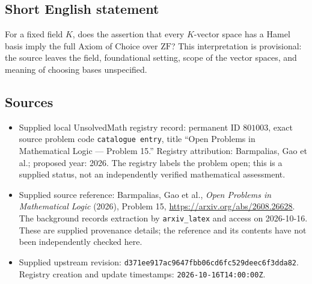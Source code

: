 \documentclass[11pt]{article}
\begin{document}
\subsection{Short English statement}
For a fixed field \(K\), does the assertion that every \(K\)-vector space has a Hamel basis imply the full Axiom of Choice over \(\mathrm{ZF}\)? This interpretation is provisional: the source leaves the field, foundational setting, scope of the vector spaces, and meaning of choosing bases unspecified.
\subsection{Sources}
\begin{itemize}
\item Supplied local UnsolvedMath registry record: permanent ID \(801003\), exact source problem code \texttt{catalogue entry}, title ``Open Problems in Mathematical Logic --- Problem 15.'' Registry attribution: Barmpalias, Gao et al.; proposed year: 2026. The registry labels the problem open; this is a supplied status, not an independently verified mathematical assessment.
\item Supplied source reference: Barmpalias, Gao et al., \emph{Open Problems in Mathematical Logic} (2026), Problem 15, \url{https://arxiv.org/abs/2608.26628}. The background records extraction by \texttt{arxiv\_latex} and access on 2026-10-16. These are supplied provenance details; the reference and its contents have not been independently checked here.
\item Supplied upstream revision: \texttt{d371ee917ac9647fbb06cd6fc529deec6f3dda82}. Registry creation and update timestamps: \texttt{2026-10-16T14:00:00Z}.
\end{itemize}
\end{document}
